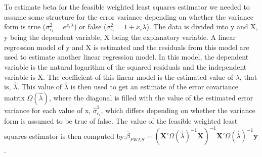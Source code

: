 \documentclass{article}\usepackage[]{graphicx}\usepackage[]{color}
\begin{document}
To estimate beta for the feasible weighted least squares estimator we needed to assume some structure for the error variance depending on whether the variance form is true ($\sigma^2_{\epsilon_i} = e^{x_i\lambda}$) or false ($\sigma^2_{\epsilon_i} = 1 + x_i\lambda$). The data is divided into y and X, y being the dependent variable, X being the explanatory variable. A linear regression model of y and X is estimated and the residuals from this model are used to estimate another linear regression model. In this model, the dependent variable is the natural logarithm of the squared residuals and the independent variable is X. The coefficient of this linear model is the estimated value of $\lambda$, that is, $\hat{\lambda}$. This value of $\hat{\lambda}$ is then used to get an estimate of the error covariance matrix $\Omega(\hat{\lambda})$, where the diagonal is filled with the value of the estimated error variance for each value of x, $\hat{\sigma}^2_{\epsilon_i}$, which differs depending on whether the variance form is assumed to be true of false. 
The value of the feasible weighted least squares estimator is then computed by:$\hat{\beta}_{FWLS}=(\textbf{X}'\Omega(\hat{\lambda})^{-1}\textbf{X})^{-1}\textbf{X}'\Omega(\hat{\lambda})^{-1}\textbf{y}$.
\end{document}
